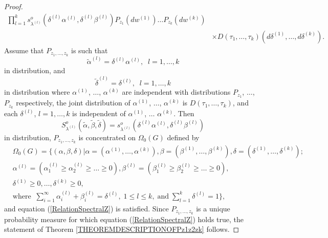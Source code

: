 \documentclass[12pt]{amsart}
\theoremstyle{definition}
\numberwithin{equation}{section}
\begin{document}
\begin{proof}
\begin{equation}
\begin{split}
\prod\limits_{l=1}^ks_{\lambda^{(l)}}^{o}\left(\delta^{(l)}\alpha^{(l)},\delta^{(l)}\beta^{(l)}\right)
P_{z_1}\left(dw^{(1)}\right)\ldots
P_{z_k}\left(dw^{(k)}\right)\\
&\times D\left(\tau_1,\ldots,\tau_k\right)\left(d\delta^{(1)},\ldots,d\delta^{(k)}\right).
\end{split}
\end{equation}
Assume that $P_{z_1,\ldots,z_k}$ is such that
$$
\tilde{\alpha}^{(l)}=\delta^{(l)}\alpha^{(l)},\;\; l=1,\ldots, k
$$
in distribution, and
$$
\tilde{\delta}^{(l)}=\delta^{(l)}, \;\; l=1,\ldots, k
$$
in distribution where $\alpha^{(1)}$, $\ldots$, $\alpha^{(k)}$ are independent with distributions
$P_{z_1}$, $\ldots$, $P_{z_k}$ respectively, the joint distribution of
$\alpha^{(1)}$, $\ldots$, $\alpha^{(k)}$ is $D(\tau_1,\ldots,\tau_k)$, and each $\delta^{(l)}$,
$l=1,\ldots, k$ is independent of $\alpha^{(1)}$, $\ldots$
$\alpha^{(k)}$.
Then
$$
S_{\lambda^{(l)}}^{o}\left(\tilde{\alpha},\tilde{\beta},\tilde{\delta}\right)
=s_{\lambda^{(l)}}^{o}\left(\delta^{(l)}\alpha^{(l)},\delta^{(l)}\beta^{(l)}\right)
$$
in distribution, $P_{z_1,\ldots,z_k}$ is concentrated on $\Omega_0(G)$ defined by
\begin{equation}\label{3.3.1.Thoma0}
\begin{split}
&\Omega_0(G)=\biggl\{(\alpha,\beta,\delta)\biggr|
\alpha=\left(\alpha^{(1)},\ldots,\alpha^{(k)}\right),\beta=\left(\beta^{(1)},\ldots,\beta^{(k)}\right),
\delta=\left(\delta^{(1)},\ldots,\delta^{(k)}\right);\\
&\alpha^{(l)}=\left(\alpha_1^{(l)}\geq\alpha_2^{(l)}\geq\ldots\geq 0\right), \beta^{(l)}=\left(\beta_1^{(l)}\geq\beta_2^{(l)}\geq\ldots\geq 0\right),\\
&\delta^{(1)}\geq 0,\ldots,\delta^{(k)}\geq 0,\\
&\mbox{where}\;\;
\sum\limits_{i=1}^{\infty}\alpha_i^{(l)}+\beta_i^{(l)}=\delta^{(l)},\; 1\leq l\leq k,\;\mbox{and}\;\sum\limits_{l=1}^k\delta^{(l)}=1\biggl\},
\end{split}
\end{equation}
and equation (\ref{RelationSpectralZ}) is satisfied.
Since $P_{z_1,\ldots,z_k}$ is a unique probability measure for which equation
(\ref{RelationSpectralZ}) holds true, the statement of Theorem \ref{THEOREMDESCRIPTIONOFPz1z2zk} follows.
\end{proof}
\end{document}
